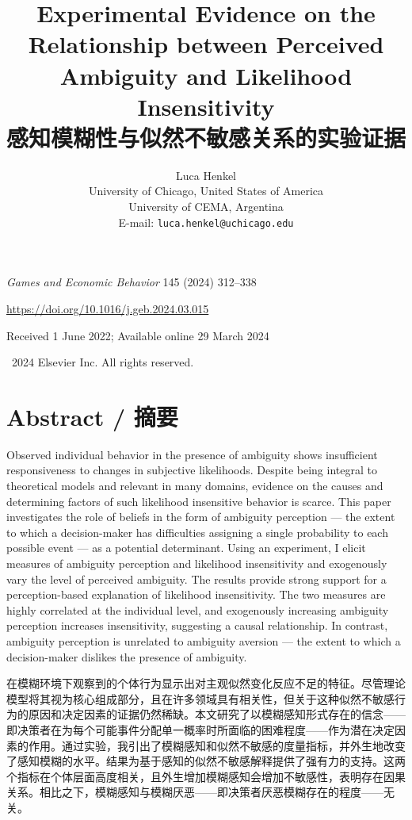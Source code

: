 \documentclass[12pt,a4paper]{article}
\title{\textbf{Experimental Evidence on the Relationship between Perceived Ambiguity and Likelihood Insensitivity}\\[6pt]
       \large\textbf{感知模糊性与似然不敏感关系的实验证据}}
\author{Luca Henkel\\[4pt]
        \small University of Chicago, United States of America\\
        \small University of CEMA, Argentina\\[4pt]
        \small E-mail: \texttt{luca.henkel@uchicago.edu}}
\date{}
\newenvironment{original}
  {\par\medskip\noindent\color{black}\ignorespaces}
  {\par\medskip}
\newenvironment{translation}
  {\par\noindent\color{transblue}\ignorespaces}
  {\par\medskip\medskip}
\begin{document}
\maketitle

\tableofcontents
\newpage

\begin{center}
\small
\textit{Games and Economic Behavior} 145 (2024) 312--338

\url{https://doi.org/10.1016/j.geb.2024.03.015}

Received 1 June 2022; Available online 29 March 2024

\textcopyright\ 2024 Elsevier Inc. All rights reserved.
\end{center}

\section*{Abstract / 摘要}

\begin{original}
Observed individual behavior in the presence of ambiguity shows insufficient responsiveness to changes in subjective likelihoods. Despite being integral to theoretical models and relevant in many domains, evidence on the causes and determining factors of such likelihood insensitive behavior is scarce. This paper investigates the role of beliefs in the form of ambiguity perception --- the extent to which a decision-maker has difficulties assigning a single probability to each possible event --- as a potential determinant. Using an experiment, I elicit measures of ambiguity perception and likelihood insensitivity and exogenously vary the level of perceived ambiguity. The results provide strong support for a perception-based explanation of likelihood insensitivity. The two measures are highly correlated at the individual level, and exogenously increasing ambiguity perception increases insensitivity, suggesting a causal relationship. In contrast, ambiguity perception is unrelated to ambiguity aversion --- the extent to which a decision-maker dislikes the presence of ambiguity.
\end{original}

\begin{translation}
在模糊环境下观察到的个体行为显示出对主观似然变化反应不足的特征。尽管理论模型将其视为核心组成部分，且在许多领域具有相关性，但关于这种似然不敏感行为的原因和决定因素的证据仍然稀缺。本文研究了以模糊感知形式存在的信念——即决策者在为每个可能事件分配单一概率时所面临的困难程度——作为潜在决定因素的作用。通过实验，我引出了模糊感知和似然不敏感的度量指标，并外生地改变了感知模糊的水平。结果为基于感知的似然不敏感解释提供了强有力的支持。这两个指标在个体层面高度相关，且外生增加模糊感知会增加不敏感性，表明存在因果关系。相比之下，模糊感知与模糊厌恶——即决策者厌恶模糊存在的程度——无关。
\end{translation}
\end{document}
